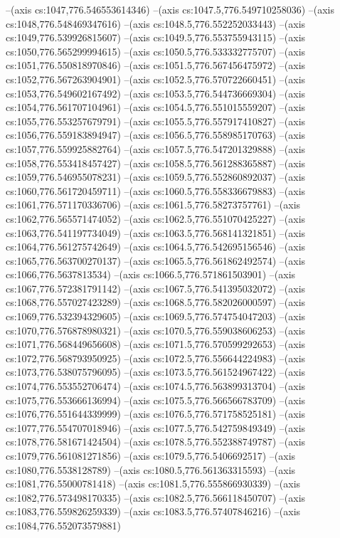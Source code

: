 --(axis cs:1047,776.546553614346)
--(axis cs:1047.5,776.549710258036)
--(axis cs:1048,776.548469347616)
--(axis cs:1048.5,776.552252033443)
--(axis cs:1049,776.539926815607)
--(axis cs:1049.5,776.553755943115)
--(axis cs:1050,776.565299994615)
--(axis cs:1050.5,776.533332775707)
--(axis cs:1051,776.550818970846)
--(axis cs:1051.5,776.567456475972)
--(axis cs:1052,776.567263904901)
--(axis cs:1052.5,776.570722660451)
--(axis cs:1053,776.549602167492)
--(axis cs:1053.5,776.544736669304)
--(axis cs:1054,776.561707104961)
--(axis cs:1054.5,776.551015559207)
--(axis cs:1055,776.553257679791)
--(axis cs:1055.5,776.557917410827)
--(axis cs:1056,776.559183894947)
--(axis cs:1056.5,776.558985170763)
--(axis cs:1057,776.559925882764)
--(axis cs:1057.5,776.547201329888)
--(axis cs:1058,776.553418457427)
--(axis cs:1058.5,776.561288365887)
--(axis cs:1059,776.546955078231)
--(axis cs:1059.5,776.552860892037)
--(axis cs:1060,776.561720459711)
--(axis cs:1060.5,776.558336679883)
--(axis cs:1061,776.571170336706)
--(axis cs:1061.5,776.58273757761)
--(axis cs:1062,776.565571474052)
--(axis cs:1062.5,776.551070425227)
--(axis cs:1063,776.541197734049)
--(axis cs:1063.5,776.568141321851)
--(axis cs:1064,776.561275742649)
--(axis cs:1064.5,776.542695156546)
--(axis cs:1065,776.563700270137)
--(axis cs:1065.5,776.561862492574)
--(axis cs:1066,776.5637813534)
--(axis cs:1066.5,776.571861503901)
--(axis cs:1067,776.572381791142)
--(axis cs:1067.5,776.541395032072)
--(axis cs:1068,776.557027423289)
--(axis cs:1068.5,776.582026000597)
--(axis cs:1069,776.532394329605)
--(axis cs:1069.5,776.574754047203)
--(axis cs:1070,776.576878980321)
--(axis cs:1070.5,776.559038606253)
--(axis cs:1071,776.568449656608)
--(axis cs:1071.5,776.570599292653)
--(axis cs:1072,776.568793950925)
--(axis cs:1072.5,776.556644224983)
--(axis cs:1073,776.538075796095)
--(axis cs:1073.5,776.561524967422)
--(axis cs:1074,776.553552706474)
--(axis cs:1074.5,776.563899313704)
--(axis cs:1075,776.553666136994)
--(axis cs:1075.5,776.566566783709)
--(axis cs:1076,776.551644339999)
--(axis cs:1076.5,776.571758525181)
--(axis cs:1077,776.554707018946)
--(axis cs:1077.5,776.542759849349)
--(axis cs:1078,776.581671424504)
--(axis cs:1078.5,776.552388749787)
--(axis cs:1079,776.561081271856)
--(axis cs:1079.5,776.5406692517)
--(axis cs:1080,776.5538128789)
--(axis cs:1080.5,776.561363315593)
--(axis cs:1081,776.55000781418)
--(axis cs:1081.5,776.555866930339)
--(axis cs:1082,776.573498170335)
--(axis cs:1082.5,776.566118450707)
--(axis cs:1083,776.559826259339)
--(axis cs:1083.5,776.57407846216)
--(axis cs:1084,776.552073579881)

